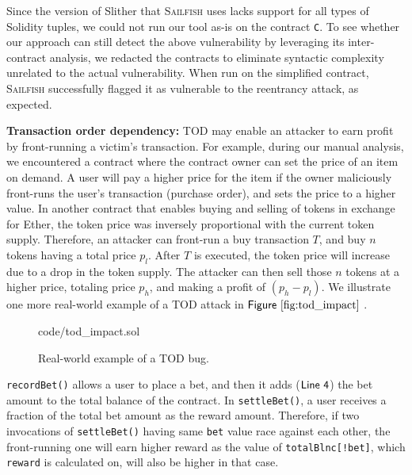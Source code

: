 \documentclass[conference, romanappendices]{tex/IEEEtran}
\theoremstyle{bfnote}
\newcommand{\toolname}{\textsc{Sailfish}\xspace}
\newcommand{\slither}{{\sc Slither}\xspace}
\newcommand{\solidity}{{\sc Solidity}\xspace}
\newcommand{\ether}{{Ether}\xspace}
\newcommand{\reentrancy}{{reentrancy}\xspace}
\newcommand{\Line}[1]{\ensuremath{\sf Line~ #1}}
\newcommand{\Fig}[1]{\ensuremath{\sf Figure~\ref{#1}}}
\begin{document}
Since the version of \slither that \toolname uses lacks support for all types of \solidity tuples, we could not run our tool as-is on the contract \texttt{C}.
To see whether our approach can still detect the above vulnerability by leveraging its inter-contract analysis, we {redacted\EndAccSupp{}} the contracts to eliminate syntactic complexity unrelated to the actual vulnerability.
When run on the simplified contract, \toolname successfully flagged it as vulnerable to the \reentrancy attack, as expected.

\noindent
\textbf{Transaction order dependency:} {TOD\EndAccSupp{}} may enable an attacker to {earn\EndAccSupp{}} profit by front-running a victim's transaction.
For example, during our manual analysis, we encountered a contract where the contract owner can set the price of an item on demand.
A user will {pay\EndAccSupp{}} a higher price for the item if the owner maliciously front-runs the user's transaction ({purchase\EndAccSupp{}} order), and sets the price to a higher value.
In another contract that enables {buying\EndAccSupp{}} and {selling\EndAccSupp{}} of tokens in exchange for \ether, the token price was inversely proportional with the current token supply.
Therefore, an attacker can front-run a buy transaction $T$, and buy $n$ tokens having a total price $p_l$.
After $T$ is executed, the token price will increase due to a drop in the token supply.
The attacker can then {sell\EndAccSupp{}} those $n$ tokens at a higher price, totaling price $p_h$, and making a profit of $(p_h - p_l)$.
We illustrate one more real-world example of a {TOD\EndAccSupp{}} attack in \Fig{fig:tod_impact} .
\begin{figure}[h]
	\vspace{-5mm}
	
	{code/tod_impact.sol}
	\vspace{-0.22in}
	\caption{Real-world example of a TOD bug.
	}
	\label{fig:tod_impact}
	\vspace{-0.1in}
\end{figure}
\texttt{recordBet()} allows a user to place a {bet\EndAccSupp{}}, and then it adds (\Line{4}) the {bet\EndAccSupp{}} amount to the total balance of the contract.
In \texttt{settleBet()}, a user receives a fraction of the total {bet\EndAccSupp{}} amount as the {reward\EndAccSupp{}} amount.
Therefore, if two invocations of \texttt{settleBet()} having same \texttt{bet} value race against each other, the front-running one will {earn\EndAccSupp{}} higher {reward\EndAccSupp{}} as the value of \texttt{totalBlnc[!bet]}, which \texttt{reward} is calculated on, will also be higher in that case.
\end{document}
